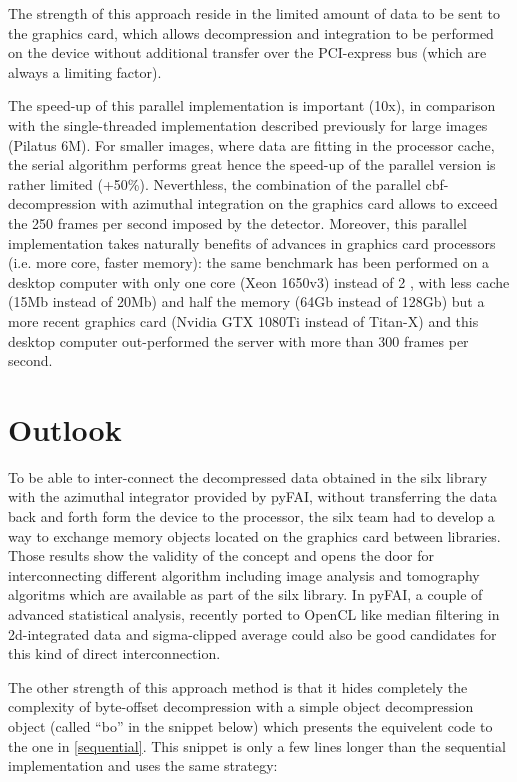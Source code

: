 \documentclass[preprint, pdf]{iucr}              %
\begin{document}
The strength of this approach reside in the limited amount of
data to be sent to the graphics card, which allows decompression and
integration to be performed on the device without additional
transfer over the PCI-express bus (which are always a limiting factor).

The speed-up of this parallel implementation is important (10x),
in comparison with the single-threaded implementation described previously for
large images (Pilatus 6M).
For smaller images, where data are fitting in the processor cache, the serial
algorithm performs great hence the speed-up of the parallel version is
rather limited (+50\%). 
Neverthless, the combination of the parallel cbf-decompression with azimuthal
integration on the graphics card allows to exceed the 250 frames per second
imposed by the detector. 
Moreover, this parallel implementation takes naturally benefits of advances in
graphics card processors (i.e. more core, faster memory): 
the same benchmark has been performed on a desktop computer with only one core
(Xeon 1650v3) instead of 2 , with less cache (15Mb instead of 20Mb) and half
the memory (64Gb instead of 128Gb) but a more recent graphics card (Nvidia GTX
1080Ti instead of Titan-X) and this desktop computer out-performed the server
with more than 300 frames per second.

\section{Outlook}

To be able to inter-connect the decompressed data obtained in the silx library
with the azimuthal integrator provided by pyFAI, without transferring the data
back and forth form the device to the processor, the silx team had to develop a
way to exchange memory objects located on the graphics card between libraries. 
Those results show the validity of the concept and opens the door for
interconnecting different algorithm including image analysis and
tomography algoritms which are available as part of the silx library.
In pyFAI, a couple of advanced statistical analysis, recently ported to
OpenCL like median filtering in 2d-integrated data and sigma-clipped
average could also be good candidates for this kind of direct interconnection.

The other strength of this approach method is that it hides completely the
complexity of byte-offset decompression with a simple object decompression
object (called ``bo'' in the snippet below) which presents the equivelent code
to the one in \ref{sequential}.
This snippet is only a few lines longer than the sequential implementation and
uses the same strategy:
\end{document}
